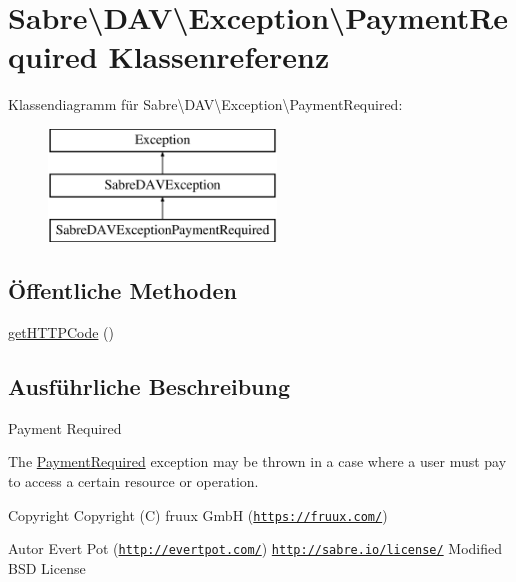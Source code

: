 \hypertarget{class_sabre_1_1_d_a_v_1_1_exception_1_1_payment_required}{}\section{Sabre\textbackslash{}D\+AV\textbackslash{}Exception\textbackslash{}Payment\+Required Klassenreferenz}
\label{class_sabre_1_1_d_a_v_1_1_exception_1_1_payment_required}
Klassendiagramm für Sabre\textbackslash{}D\+AV\textbackslash{}Exception\textbackslash{}Payment\+Required\+:\begin{figure}[H]
\begin{center}
\leavevmode
\includegraphics[height=3.000000cm]{class_sabre_1_1_d_a_v_1_1_exception_1_1_payment_required}
\end{center}
\end{figure}
\subsection*{Öffentliche Methoden}
\begin{DoxyCompactItemize}
\item 
\mbox{\hyperlink{class_sabre_1_1_d_a_v_1_1_exception_1_1_payment_required_a6617cac062b0b11ee2680c0c0c8d654f}{get\+H\+T\+T\+P\+Code}} ()
\end{DoxyCompactItemize}


\subsection{Ausführliche Beschreibung}
Payment Required

The \mbox{\hyperlink{class_sabre_1_1_d_a_v_1_1_exception_1_1_payment_required}{Payment\+Required}} exception may be thrown in a case where a user must pay to access a certain resource or operation.

\begin{DoxyCopyright}{Copyright}
Copyright (C) fruux GmbH (\href{https://fruux.com/}{\tt https\+://fruux.\+com/}) 
\end{DoxyCopyright}
\begin{DoxyAuthor}{Autor}
Evert Pot (\href{http://evertpot.com/}{\tt http\+://evertpot.\+com/})  \href{http://sabre.io/license/}{\tt http\+://sabre.\+io/license/} Modified B\+SD License 
\end{DoxyAuthor}


